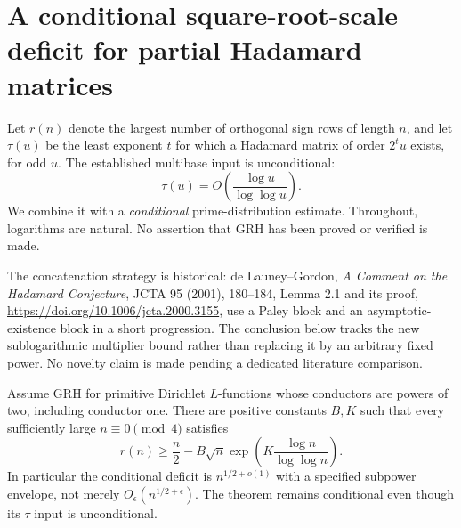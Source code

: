 \section{A conditional square-root-scale deficit for partial Hadamard matrices}
\label{sec:conditional-half-frame}

Let $r(n)$ denote the largest number of orthogonal sign rows of length
$n$, and let $\tau(u)$ be the least exponent $t$ for which a Hadamard
matrix of order $2^tu$ exists, for odd $u$. The established multibase
input is unconditional:
\[
 \tau(u)=O\!\left(\frac{\log u}{\log\log u}\right).
\]
We combine it with a \emph{conditional} prime-distribution estimate.
Throughout, logarithms are natural. No assertion that GRH has been
proved or verified is made.

The concatenation strategy is historical: de Launey--Gordon,
\emph{A Comment on the Hadamard Conjecture}, JCTA 95 (2001),
180--184, Lemma 2.1 and its proof,
\url{https://doi.org/10.1006/jcta.2000.3155}, use a Paley block and
an asymptotic-existence block in a short progression. The conclusion
below tracks the new sublogarithmic multiplier bound rather than
replacing it by an arbitrary fixed power. No novelty claim is made
pending a dedicated literature comparison.

\begin{theorem}
Assume GRH for primitive Dirichlet $L$-functions whose conductors are
powers of two, including conductor one. There are positive constants
$B,K$ such that every sufficiently large $n\equiv0\pmod4$ satisfies
\[
 \boxed{r(n)\ge\frac n2-
 B\sqrt n\exp\!\left(K\frac{\log n}{\log\log n}\right).}
\]
In particular the conditional deficit is $n^{1/2+o(1)}$ with a
specified subpower envelope, not merely $O_\epsilon(n^{1/2+\epsilon})$.
The theorem remains conditional even though its $\tau$ input is
unconditional.
\end{theorem}

